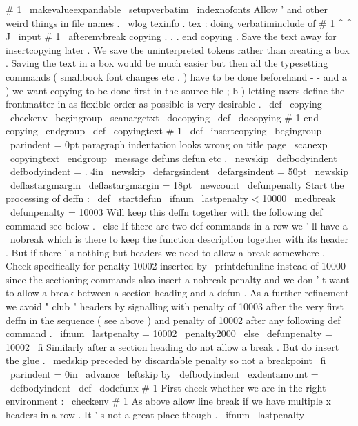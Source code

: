 {{{{#
1
{
%
{
%
\
makevalueexpandable
\
setupverbatim
\
indexnofonts
%
Allow
'
and
other
weird
things
in
file
names
.
\
wlog
{
texinfo
.
tex
:
doing
verbatiminclude
of
#
1
^
^
J
}
%
\
input
#
1
\
afterenvbreak
}
%
}
%
copying
.
.
.
end
copying
.
%
Save
the
text
away
for
insertcopying
later
.
%
%
We
save
the
uninterpreted
tokens
rather
than
creating
a
box
.
%
Saving
the
text
in
a
box
would
be
much
easier
but
then
all
the
%
typesetting
commands
(
smallbook
font
changes
etc
.
)
have
to
be
done
%
beforehand
-
-
and
a
)
we
want
copying
to
be
done
first
in
the
source
%
file
;
b
)
letting
users
define
the
frontmatter
in
as
flexible
order
as
%
possible
is
very
desirable
.
%
\
def
\
copying
{
\
checkenv
{
}
\
begingroup
\
scanargctxt
\
docopying
}
\
def
\
docopying
#
1
end
copying
{
\
endgroup
\
def
\
copyingtext
{
#
1
}
}
%
\
def
\
insertcopying
{
%
\
begingroup
\
parindent
=
0pt
%
paragraph
indentation
looks
wrong
on
title
page
\
scanexp
\
copyingtext
\
endgroup
}
\
message
{
defuns
}
%
defun
etc
.
\
newskip
\
defbodyindent
\
defbodyindent
=
.
4in
\
newskip
\
defargsindent
\
defargsindent
=
50pt
\
newskip
\
deflastargmargin
\
deflastargmargin
=
18pt
\
newcount
\
defunpenalty
%
Start
the
processing
of
deffn
:
\
def
\
startdefun
{
%
\
ifnum
\
lastpenalty
<
10000
\
medbreak
\
defunpenalty
=
10003
%
Will
keep
this
deffn
together
with
the
%
following
def
command
see
below
.
\
else
%
If
there
are
two
def
commands
in
a
row
we
'
ll
have
a
\
nobreak
%
which
is
there
to
keep
the
function
description
together
with
its
%
header
.
But
if
there
'
s
nothing
but
headers
we
need
to
allow
a
%
break
somewhere
.
Check
specifically
for
penalty
10002
inserted
%
by
\
printdefunline
instead
of
10000
since
the
sectioning
%
commands
also
insert
a
nobreak
penalty
and
we
don
'
t
want
to
allow
%
a
break
between
a
section
heading
and
a
defun
.
%
%
As
a
further
refinement
we
avoid
"
club
"
headers
by
signalling
%
with
penalty
of
10003
after
the
very
first
deffn
in
the
%
sequence
(
see
above
)
and
penalty
of
10002
after
any
following
%
def
command
.
\
ifnum
\
lastpenalty
=
10002
\
penalty2000
\
else
\
defunpenalty
=
10002
\
fi
%
%
Similarly
after
a
section
heading
do
not
allow
a
break
.
%
But
do
insert
the
glue
.
\
medskip
%
preceded
by
discardable
penalty
so
not
a
breakpoint
\
fi
%
\
parindent
=
0in
\
advance
\
leftskip
by
\
defbodyindent
\
exdentamount
=
\
defbodyindent
}
\
def
\
dodefunx
#
1
{
%
%
First
check
whether
we
are
in
the
right
environment
:
\
checkenv
#
1
%
%
%
As
above
allow
line
break
if
we
have
multiple
x
headers
in
a
row
.
%
It
'
s
not
a
great
place
though
.
\
ifnum
\
lastpenalty
}}}}}
